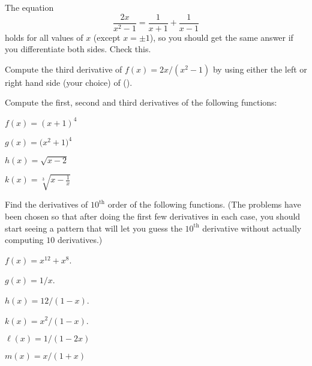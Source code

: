 \begin{multicols}{2}\setlength{\parindent}{0pt}
\problem  The equation 
\begin{equation}
  \frac{2x}{x^2-1}= \frac{1}{x+1}+\frac{1}{x-1}  \tag{\dag}
\end{equation}
holds for all values of $x$ (except $x=\pm1$), so you should get
the same answer if you differentiate both sides.  Check this.




Compute the third derivative of $f(x) = 2x/(x^2-1)$ by using either the
left or right hand side (your choice) of (\dag).




\problem Compute the first, second and third derivatives of the following 
functions:




\subprob $f(x) = (x+1)^4$




\subprob $g(x) = \bigl(x^2+1\bigr)^4$




\subprob $h(x) = \sqrt{x-2} $




\subprob $k(x) = \sqrt[3]{x-\frac1x}$
















\problem Find the derivatives of $10^\text{th}$ order of the following 
functions. (The problems have been chosen so that after doing the
first few derivatives in each case, you should start seeing a pattern
that will let you guess the $10^{\text{th}}$ derivative without
actually computing $10$ derivatives.)




\subprob $  f(x) = x^{12}+x^8 $.




\subprob $  g(x) = 1/x $.




\subprob $  h(x) = 12/(1-x)$.




\subprob $  k(x) = x^2/(1-x)$.




\subprob $  \ell(x) = 1/(1-2x)$




\subprob $  m(x) = x/(1+x)$









\end{multicols}
